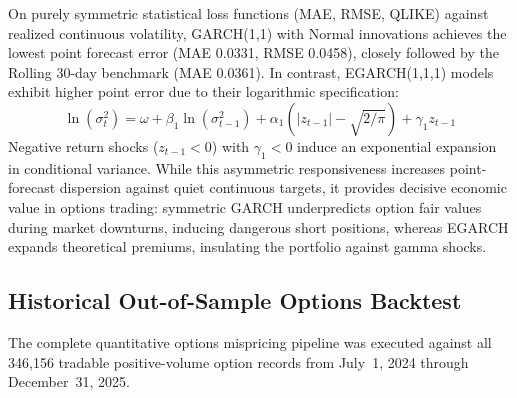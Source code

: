 \documentclass[journal]{IEEEtran}
\begin{document}
On purely symmetric statistical loss functions (MAE, RMSE, QLIKE) against realized continuous volatility, GARCH(1,1) with Normal innovations achieves the lowest point forecast error (MAE 0.0331, RMSE 0.0458), closely followed by the Rolling 30-day benchmark (MAE 0.0361). In contrast, EGARCH(1,1,1) models exhibit higher point error due to their logarithmic specification:
\begin{equation}
\ln(\sigma_t^2) = \omega + \beta_1 \ln(\sigma_{t-1}^2) + \alpha_1 \left( |z_{t-1}| - \sqrt{2/\pi} \right) + \gamma_1 z_{t-1}
\end{equation}
Negative return shocks ($z_{t-1} < 0$) with $\gamma_1 < 0$ induce an exponential expansion in conditional variance. While this asymmetric responsiveness increases point-forecast dispersion against quiet continuous targets, it provides decisive economic value in options trading: symmetric GARCH underpredicts option fair values during market downturns, inducing dangerous short positions, whereas EGARCH expands theoretical premiums, insulating the portfolio against gamma shocks.

\subsection{Historical Out-of-Sample Options Backtest}
The complete quantitative options mispricing pipeline was executed against all 346{,}156 tradable positive-volume option records from July~1, 2024 through December~31, 2025.
\end{document}
